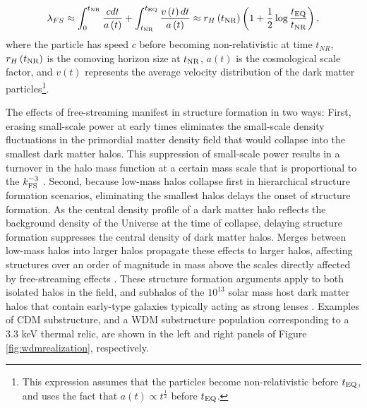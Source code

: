 \begin{equation}
\label{eqn:freestreaming}
\lambda_{FS} \approx \int_{0}^{t_{\rm{NR}}} \frac{c dt}{a\left(t\right)} +  \int_{t_{\rm{NR}}}^{t_{\rm{EQ}}} \frac{v\left(t\right) dt}{a\left(t\right)} \approx r_{H}\left(t_{\rm{NR}}\right) \left(1 +\frac{1}{2} \log \frac{t_{\rm{EQ}}}{t_{\rm{NR}}} \right),
\end{equation}
where the particle has speed $c$ before becoming non-relativistic at time $t_{NR}$, $r_H \left(t_{\rm{NR}}\right)$ is the comoving horizon size at $t_{\rm{NR}}$, $a\left(t\right)$ is the cosmological scale factor, and $v\left(t\right)$ represents the average velocity distribution of the dark matter particles\footnote{This expression assumes that the particles become non-relativistic before $t_{\rm{EQ}}$, and uses the fact that $a\left(t\right)\propto t^{\frac{1}{2}}$ before $t_{\rm{EQ}}$.}. 

The effects of free-streaming manifest in structure formation in two ways: First, erasing small-scale power at early times eliminates the small-scale density fluctuations in the primordial matter density field that would collapse into the smallest dark matter halos. This suppression of small-scale power results in a turnover in the halo mass function at a certain mass scale that is proportional to the $k_{\rm{FS}}^{-3}$ \cite{AvilaReese++01,Schneider++12,Lovell++14}. Second, because low-mass halos collapse first in hierarchical structure formation scenarios, eliminating the smallest halos delays the onset of structure formation. As the central density profile of a dark matter halo reflects the background density of the Universe at the time of collapse, delaying structure formation suppresses the central density of dark matter halos. Merges between low-mass halos into larger halos propagate these effects to larger halos, affecting structures over an order of magnitude in mass above the scales directly affected by free-streaming effects \cite{Navarro++96,Bose++16}. These structure formation arguments apply to both isolated halos in the field, and subhalos of the $10^{13}$ solar mass host dark matter halos that contain early-type galaxies typically acting as strong lenses \cite{Gavazzi++07}. Examples of CDM substructure, and a WDM substructure population corresponding to a 3.3 keV thermal relic, are shown in the left and right panels of Figure \ref{fig:wdmrealization}, respectively. 

